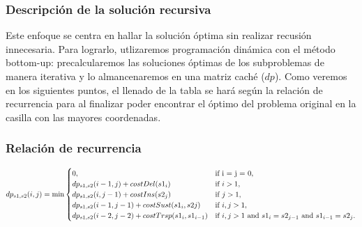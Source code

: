 


\subsubsection{Descripción de la solución recursiva}
Este enfoque se centra en hallar la solución óptima sin realizar recusión innecesaria. Para lograrlo, utlizaremos programación dinámica con el método bottom-up:
precalcularemos las soluciones óptimas de los subproblemas de manera iterativa y lo almancenaremos en una matriz caché ($dp$). Como veremos en los siguientes puntos,
el llenado de la tabla se hará según la relación de recurrencia para al finalizar poder encontrar el óptimo del problema original en la casilla con las mayores coordenadas.

\subsubsection{Relación de recurrencia}

\begin{equation}
    dp_{s1,s2}(i,j)=\min\begin{cases}
      0, & \text{if i = j = 0},\\
      dp_{s1,s2}(i-1,j) + costDel(s1_{i}) & \text{if $i > 1$},\\
      dp_{s1,s2}(i,j-1) + costIns(s2_{j}) & \text{if $j > 1$},\\
      dp_{s1,s2}(i-1,j-1) + costSust(s1_{i},s2{j}) & \text{if $i,j > 1$},\\
      dp_{s1,s2}(i-2,j-2) + costTrsp(s1_{i},s1_{i-1}) & \text{if $i,j > 1 $ and $ s1_{i} = s2_{j-1}$ and $s1_{i-1} = s2_{j}.$}
    \end{cases}
\end{equation}
